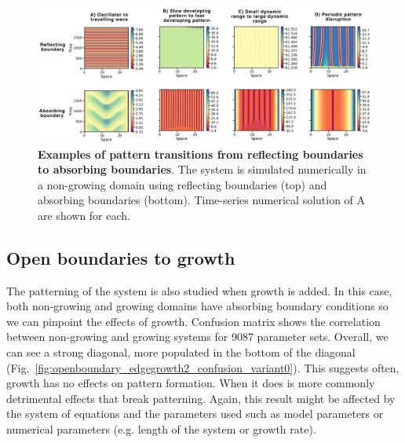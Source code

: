\begin{figure}[H] %
    \centering
    \begin{adjustbox}{center}
        \includegraphics[width=1\textwidth]{chapters/Chapter 1/interesting_cases_openboundary} %
    \end{adjustbox}
    \caption{\textbf{Examples of pattern transitions from reflecting boundaries to absorbing boundaries}. The system is simulated numerically in a non-growing domain using reflecting boundaries (top) and absorbing boundaries (bottom). Time-series numerical solution of A are shown for each.}
    \label{fig:interesting_cases_openboundary}
\end{figure}

\subsection{Open boundaries to growth}
The patterning of the system is also studied when growth is added.
In this case, both non-growing and growing domains have absorbing boundary conditions so we can pinpoint the effects of growth.
Confusion matrix shows the correlation between non-growing and growing systems for 9087 parameter sets.
Overall, we can see a strong diagonal, more populated in the bottom of the diagonal (Fig.~\ref{fig:openboundary_edgegrowth2_confusion_variant0}). This suggests often, growth has no effects on pattern formation.
When it does is more commonly detrimental effects that break patterning.
Again, this result might be affected by the system of equations and the parameters used such as model parameters or numerical parameters (e.g. length of the system or growth rate). %

